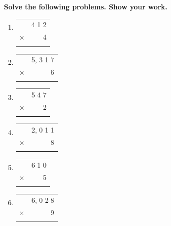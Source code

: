 \documentclass[11pt, a4paper]{article}
\begin{document}
\textbf{Solve the following problems. Show your work.}

\begin{enumerate}[label=\arabic*.]
    \item \begin{tabular}{c r}
          & 4 1 2 \\
        $\times$ & 4 \\ \hline
          & \\ \hline
    \end{tabular}
    \hfill
    \setcounter{enumi}{5}
    \item \begin{tabular}{c r}
          & 5, 3 1 7 \\
        $\times$ & 6 \\ \hline
          & \\ \hline
    \end{tabular}

    \vspace{1cm}
    \setcounter{enumi}{1}
    \item \begin{tabular}{c r}
          & 5 4 7 \\
        $\times$ & 2 \\ \hline
          & \\ \hline
    \end{tabular}
    \hfill
    \setcounter{enumi}{6}
    \item \begin{tabular}{c r}
          & 2, 0 1 1 \\
        $\times$ & 8 \\ \hline
          & \\ \hline
    \end{tabular}

    \vspace{1cm}
    \setcounter{enumi}{2}
    \item \begin{tabular}{c r}
          & 6 1 0 \\
        $\times$ & 5 \\ \hline
          & \\ \hline
    \end{tabular}
    \hfill
    \setcounter{enumi}{7}
    \item \begin{tabular}{c r}
          & 6, 0 2 8 \\
        $\times$ & 9 \\ \hline
          & \\ \hline
    \end{tabular}


\end{enumerate}
\end{document}
